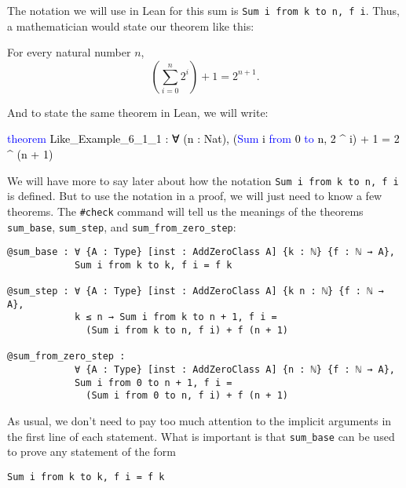 \documentclass[
  letterpaper,
  DIV=11,
  numbers=noendperiod]{scrreprt}
\newenvironment{Shaded}{\begin{snugshade}}{\end{snugshade}}
\newcommand{\KeywordTok}[1]{\textcolor[rgb]{0.00,0.23,0.31}{#1}}
\newcommand{\NormalTok}[1]{\textcolor[rgb]{0.00,0.23,0.31}{#1}}
\renewcommand{\NormalTok}[1]{\textcolor[HTML]{000000}{#1}}
\renewcommand{\KeywordTok}[1]{\textcolor[HTML]{0000FF}{#1}}
\newenvironment{ind}
	{\begin{list}{}{\setlength{\leftmargin}{1em}}\item\relax}
	{\end{list}}
\theoremstyle{remark}
\begin{document}
The notation we will use in Lean for this sum is
\texttt{Sum\ i\ from\ k\ to\ n,\ f\ i}. Thus, a mathematician would
state our theorem like this:

\begin{thm}
For every natural number \(n\), \[
\left(\sum_{i=0}^n 2^i\right) + 1 = 2^{n+1}.
\]

\end{thm}

And to state the same theorem in Lean, we will write:

\begin{Shaded}
\begin{Highlighting}[]
\KeywordTok{theorem}\NormalTok{ Like\_Example\_6\_1\_1 :}
\NormalTok{    ∀ (n : Nat), (}\KeywordTok{Sum}\NormalTok{ i }\KeywordTok{from}\NormalTok{ 0 }\KeywordTok{to}\NormalTok{ n, 2 \^{} i) + 1 = 2 \^{} (n + 1)}
\end{Highlighting}
\end{Shaded}

We will have more to say later about how the notation
\texttt{Sum\ i\ from\ k\ to\ n,\ f\ i} is defined. But to use the
notation in a proof, we will just need to know a few theorems. The
\texttt{\#check} command will tell us the meanings of the theorems
\texttt{sum\_base}, \texttt{sum\_step}, and
\texttt{sum\_from\_zero\_step}:

\begin{ind}

\begin{verbatim}
@sum_base : ∀ {A : Type} [inst : AddZeroClass A] {k : ℕ} {f : ℕ → A},
            Sum i from k to k, f i = f k

@sum_step : ∀ {A : Type} [inst : AddZeroClass A] {k n : ℕ} {f : ℕ → A},
            k ≤ n → Sum i from k to n + 1, f i =
              (Sum i from k to n, f i) + f (n + 1)

@sum_from_zero_step :
            ∀ {A : Type} [inst : AddZeroClass A] {n : ℕ} {f : ℕ → A},
            Sum i from 0 to n + 1, f i =
              (Sum i from 0 to n, f i) + f (n + 1)
\end{verbatim}

\end{ind}

As usual, we don't need to pay too much attention to the implicit
arguments in the first line of each statement. What is important is that
\texttt{sum\_base} can be used to prove any statement of the form

\begin{ind}

\begin{verbatim}
Sum i from k to k, f i = f k
\end{verbatim}

\end{ind}
\end{document}
